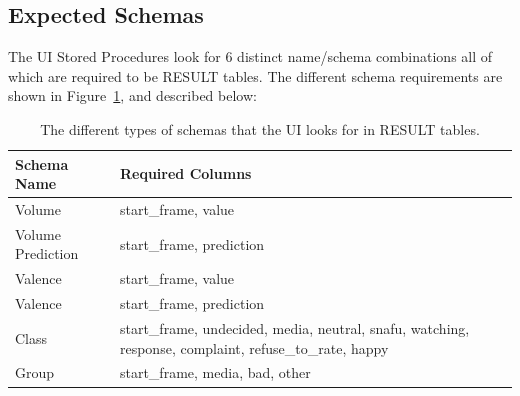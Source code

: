 \documentclass[12pt]{ucthesis}
\begin{document}
\subsection{Expected Schemas}
\label{arch-database-sp-schemas}
The UI Stored Procedures look for 6 distinct name/schema combinations all of which are required to be RESULT tables.
The different schema requirements are shown in Figure~\ref{fig:ui-expected-schema}, and described below:

\begin{table}
   \begin{center}
      \begin{tabular}{|l|p{12cm}|}
         \hline
            Schema Name & Required Columns
         \tabularnewline\hline
            Volume & \textsf{start\_frame}, \textsf{value}
         \tabularnewline\hline
            Volume Prediction & \textsf{start\_frame}, \textsf{prediction}
         \tabularnewline\hline
            Valence & \textsf{start\_frame}, \textsf{value}
         \tabularnewline\hline
            Valence & \textsf{start\_frame}, \textsf{prediction}
         \tabularnewline\hline
            Class & \textsf{start\_frame}, \textsf{undecided}, \textsf{media}, \textsf{neutral}, \textsf{snafu}, \textsf{watching}, \textsf{response}, \textsf{complaint}, \textsf{refuse\_to\_rate}, \textsf{happy}
         \tabularnewline\hline
            Group & \textsf{start\_frame}, \textsf{media}, \textsf{bad}, \textsf{other}
         \tabularnewline\hline
      \end{tabular}
   \end{center}
   \caption[Stored Procedure UI Expected Schema]{The different types of schemas that the UI looks for in RESULT tables.}
   \label{fig:ui-expected-schema}
\end{table}
\end{document}
